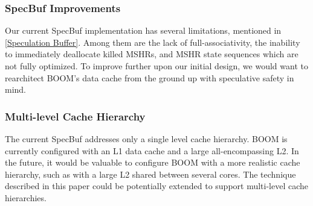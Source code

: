 \subsubsection{SpecBuf Improvements}

Our current SpecBuf implementation has several limitations, mentioned in \ref{Speculation Buffer}.
Among them are the lack of full-associativity, the inability to immediately deallocate killed MSHRs,
and MSHR state sequences which are not fully optimized.
To improve further upon our initial design, we would want to rearchitect BOOM's data cache from
the ground up with speculative safety in mind. 

\subsubsection{Multi-level Cache Hierarchy}

The current SpecBuf addresses only a single level cache hierarchy.
BOOM is currently configured with an L1 data cache and a large all-encompassing L2.
In the future, it would be valuable to configure BOOM with a more realistic cache hierarchy,
such as with a large L2 shared between several cores. The technique described in this paper
could be potentially extended to support multi-level cache hierarchies.
